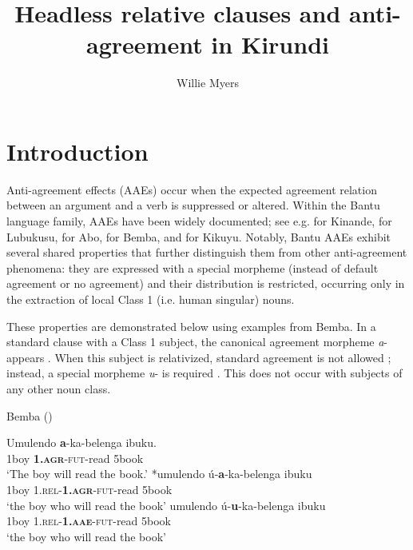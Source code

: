 \documentclass[output=paper,colorlinks,citecolor=brown
]{langscibook}
\author{Willie Myers\affiliation{McGill University}}
\title{Headless relative clauses and anti-agreement in Kirundi}
\begin{document}
\maketitle

\section{Introduction}

 Anti-agreement effects (AAEs) occur when the expected agreement relation between an argument and a verb is suppressed or altered. Within the Bantu language family, AAEs have been widely documented; see e.g. \citet{SchneiderZioga:2000,SchneiderZioga:2007} for Kinande, \citet{Diercks:2009, Diercks:2010} for Lubukusu, \citet{Burns:2013} for Abo, \citet{Cheng:2006,BHenderson:2007,BHenderson:2009,BHenderson:2013} for Bemba, and \citet{Baier:2018} for Kikuyu. Notably, Bantu AAEs exhibit several shared properties that further distinguish them from other anti-agreement phenomena: they are expressed with a special morpheme (instead of default agreement or no agreement) and their distribution is restricted, occurring only in the extraction of local Class 1 (i.e. human singular) nouns.
 
 These properties are demonstrated below using examples from Bemba. In a standard clause with a Class 1 subject, the canonical agreement morpheme \emph{a}- appears . When this subject is relativized, standard agreement is not allowed ; instead, a special morpheme \emph{u}- is required . This does not occur with subjects of any other noun class.

\ea \label{ex:myers:bemba} Bemba (\citealt[197]{Cheng:2006})
			\begin{xlist}
 \ex \gll {}Umulendo {\bfseries  a}-ka-belenga ibuku. \\
	1boy {\bfseries  \textsc{1.agr}}-\textsc{fut}-read 5book \\
	 \glt {}`The boy will read the book.' \label{ex:myers:noaae} 
\ex \gll  {}*umulendo \'u-{\bfseries  a}-ka-belenga ibuku \\
	1boy \textsc{1.rel}-{\bfseries  \textsc{1.agr}}-\textsc{fut}-read 5book \\
	 \glt {}`the boy who will read the book' \label{ex:myers:no} 
	\ex	\gll {}umulendo \'u-{\bfseries  u}-ka-belenga ibuku \\
	1boy \textsc{1.rel}-{\bfseries  \textsc{1.aae}}-\textsc{fut}-read 5book \\
	\glt {}`the boy who will read the book' \label{ex:myers:yesaae} 
				\end{xlist}
				\z
\end{document}
